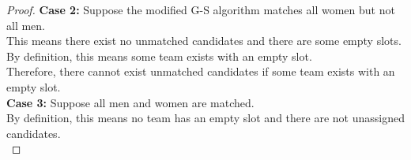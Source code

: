 \begin{problem}
\begin{proof}
    \textbf{Case 2:} Suppose the modified G-S algorithm matches all women but not all men. \\
    This means there exist no unmatched candidates and there are some empty slots. \\
    By definition, this means some team exists with an empty slot. \\
    Therefore, there cannot exist unmatched candidates if some team exists with an empty slot. \\
    \textbf{Case 3:} Suppose all men and women are matched. \\
    By definition, this means no team has an empty slot and there are not unassigned candidates. \\
    \end{proof}
\end{problem}
